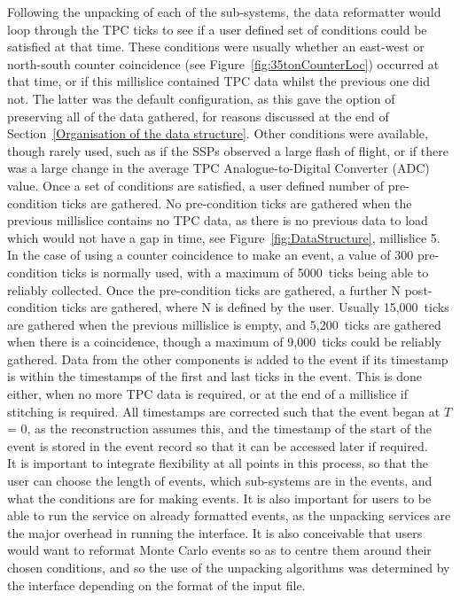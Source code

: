 Following the unpacking of each of the sub-systems, the data reformatter would loop through the TPC ticks to see if a user defined set of conditions could be satisfied at that time. These conditions were usually whether an east-west or north-south counter coincidence (see Figure~\ref{fig:35tonCounterLoc}) occurred at that time, or if this millislice contained TPC data whilst the previous one did not. The latter was the default configuration, as this gave the option of preserving all of the data gathered, for reasons discussed at the end of Section~\ref{Organisation of the data structure}. Other conditions were available, though rarely used, such as if the SSPs observed a large flash of flight, or if there was a large change in the average TPC Analogue-to-Digital Converter (ADC) value. Once a set of conditions are satisfied, a user defined number of pre-condition ticks are gathered. No pre-condition ticks are gathered when the previous millislice contains no TPC data, as there is no previous data to load which would not have a gap in time, see Figure~\ref{fig:DataStructure}, millislice 5. In the case of using a counter coincidence to make an event, a value of 300 pre-condition ticks is normally used, with a maximum of 5000~ticks being able to reliably collected. Once the pre-condition ticks are gathered, a further N post-condition ticks are gathered, where N is defined by the user. Usually 15,000~ticks are gathered when the previous millislice is empty, and 5,200~ticks are gathered when there is a coincidence, though a maximum of 9,000~ticks could be reliably gathered. Data from the other components is added to the event if its timestamp is within the timestamps of the first and last ticks in the event. This is done either, when no more TPC data is required, or at the end of a millislice if stitching is required. All timestamps are corrected such that the event began at $T$ = 0, as the reconstruction assumes this, and the timestamp of the start of the event is stored in the event record so that it can be accessed later if required. \\

It is important to integrate flexibility at all points in this process, so that the user can choose the length of events, which sub-systems are in the events, and what the conditions are for making events. It is also important for users to be able to run the service on already formatted events, as the unpacking services are the major overhead in running the interface. It is also conceivable that users would want to reformat Monte Carlo events so as to centre them around their chosen conditions, and so the use of the unpacking algorithms was determined by the interface depending on the format of the input file.

